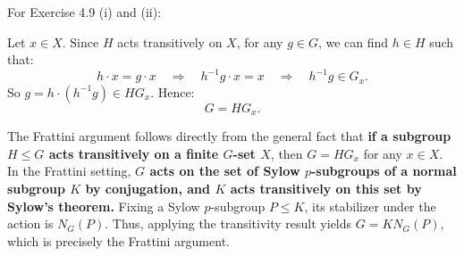 \documentclass{article}
\begin{document}
For Exercise 4.9 (i) and (ii):

Let $x \in X$. Since $H$ acts transitively on $X$, for any $g \in G$, we can find $h \in H$ such that:
$$
h \cdot x = g \cdot x \quad \Rightarrow \quad h^{-1}g \cdot x = x \quad \Rightarrow \quad h^{-1}g \in G_x.
$$
So $g = h \cdot (h^{-1}g) \in H G_x$. Hence:
$$
G = H G_x.
$$

The Frattini argument follows directly from the general fact that \textbf{if a subgroup $H \le G$ acts transitively on a finite $G$-set $X$}, then $G = H G_x$ for any $x \in X$. In the Frattini setting, \textbf{$G$ acts on the set of Sylow $p$-subgroups of a normal subgroup $K$ by conjugation, and $K$ acts transitively on this set by Sylow’s theorem.} Fixing a Sylow $p$-subgroup $P \le K$, its stabilizer under the action is $N_G(P)$. Thus, applying the transitivity result yields $G = K N_G(P)$, which is precisely the Frattini argument.
\end{document}
